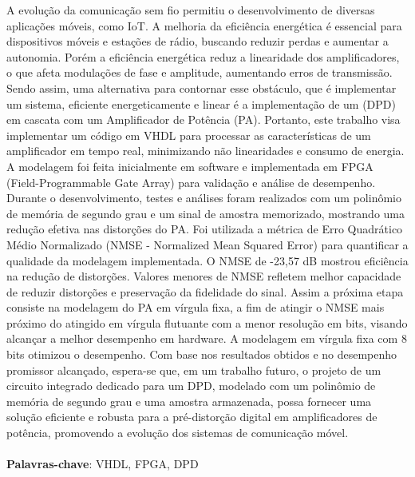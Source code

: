 A evolução da comunicação sem fio permitiu o desenvolvimento de diversas aplicações móveis, como IoT. A melhoria da eficiência energética é essencial para dispositivos móveis e estações de rádio, buscando reduzir perdas e aumentar a autonomia. Porém a eficiência energética reduz a linearidade dos amplificadores, o que afeta modulações de fase e amplitude, aumentando erros de transmissão. Sendo assim, uma alternativa para contornar esse obstáculo, que é implementar um sistema, eficiente energeticamente e linear é a implementação de um (DPD) em cascata com um Amplificador de Potência (PA). Portanto, este trabalho visa implementar um código em VHDL para processar as características de um amplificador em tempo real, minimizando não linearidades e consumo de energia. A modelagem foi feita inicialmente em software e implementada em FPGA (Field-Programmable Gate Array) para validação e análise de desempenho. Durante o desenvolvimento, testes e análises foram realizados com um polinômio de memória de segundo grau e um sinal de amostra memorizado, mostrando uma redução efetiva nas distorções do PA. Foi utilizada a métrica de Erro Quadrático Médio Normalizado (NMSE - Normalized Mean Squared Error) para quantificar a qualidade da modelagem implementada. O NMSE de -23,57 dB mostrou eficiência na redução de distorções. Valores menores de NMSE refletem melhor capacidade de reduzir distorções e preservação da fidelidade do sinal. Assim a próxima etapa consiste na modelagem do PA em vírgula fixa, a fim de atingir o NMSE mais próximo do atingido em vírgula flutuante com a menor resolução em bits, visando alcançar a melhor desempenho em hardware. A modelagem em vírgula fixa com 8 bits otimizou o desempenho. Com base nos resultados obtidos e no desempenho promissor alcançado, espera-se que, em um trabalho futuro, o projeto de um circuito integrado dedicado para um DPD, modelado com um polinômio de memória de segundo grau e uma amostra armazenada, possa fornecer uma solução eficiente e robusta para a pré-distorção digital em amplificadores de potência, promovendo a evolução dos sistemas de comunicação móvel.
\\
\\
\textbf{Palavras-chave}: VHDL, FPGA, DPD 
